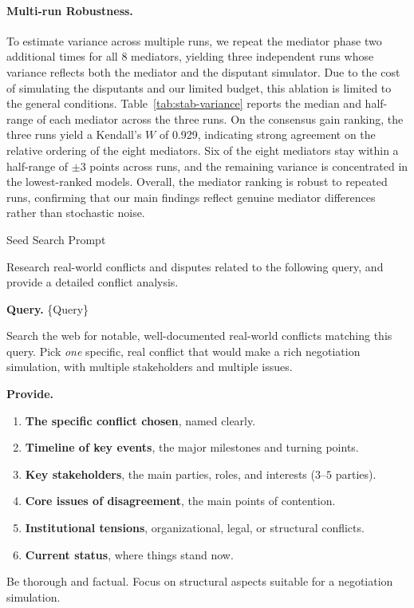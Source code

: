 \documentclass{llmxive}
\begin{document}
\paragraph{Multi-run Robustness.}
\label{app:run_variance}
To estimate variance across multiple runs, we repeat the mediator phase two additional times for all 8 mediators, yielding three independent runs whose variance reflects both the mediator and the disputant simulator. Due to the cost of simulating the disputants and our limited budget, this ablation is limited to the general conditions. Table~\ref{tab:stab-variance} reports the median and half-range of each mediator across the three runs. On the consensus gain ranking, the three runs yield a Kendall's $W$ of 0.929, indicating strong agreement on the relative ordering of the eight mediators. Six of the eight mediators stay within a half-range of $\pm 3$ points across runs, and the remaining variance is concentrated in the lowest-ranked models. Overall, the mediator ranking is robust to repeated runs, confirming that our main findings reflect genuine mediator differences rather than stochastic noise.





\begin{table}[p]
\centering
\begin{promptbox}{Seed Search Prompt}
\begin{userbox}
\scriptsize
Research real-world conflicts and disputes related to the following query, and provide a detailed conflict analysis.

\smallskip
\textbf{Query.} \{Query\}

\smallskip
Search the web for notable, well-documented real-world conflicts matching this query. Pick \emph{one} specific, real conflict that would make a rich negotiation simulation, with multiple stakeholders and multiple issues.

\smallskip
\textbf{Provide.}
\begin{enumerate}[leftmargin=*, noitemsep, topsep=2pt]
\item \textbf{The specific conflict chosen}, named clearly.
\item \textbf{Timeline of key events}, the major milestones and turning points.
\item \textbf{Key stakeholders}, the main parties, roles, and interests ($3$--$5$ parties).
\item \textbf{Core issues of disagreement}, the main points of contention.
\item \textbf{Institutional tensions}, organizational, legal, or structural conflicts.
\item \textbf{Current status}, where things stand now.
\end{enumerate}

\smallskip
Be thorough and factual. Focus on structural aspects suitable for a negotiation simulation.
\end{userbox}
\end{promptbox}
\vspace{-0.25cm}
\vspace{-0.3cm}
\label{tab:prompt-research}
\caption{Prompt for seed search.}
\end{table}
\end{document}
